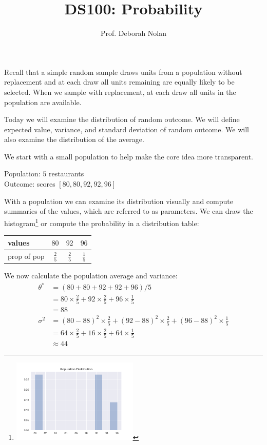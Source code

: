 \documentclass{tufte-handout}
\title{DS100: Probability}
\author{Prof. Deborah Nolan}
\date{\marginnote{Scribe: Simon Mo}}
\begin{document}
\maketitle

Recall that a simple random sample draws units from a population without replacement and at each draw all units remaining are equally likely to be selected. When we sample with replacement, at each draw all units in the population are available.

Today we will examine the distribution of random outcome. We will define expected value, variance, and standard deviation of random outcome. We will also examine the distribution of the average. 

We start with a small population to help make the core idea more transparent. 

\begin{center}
	Population: $5$ restaurants\\
	Outcome: scores $[80,80,92,92,96]$
\end{center}

With a population we can examine its distribution visually and compute summaries of the values, which are referred to as parameters. We can draw the histogram\footnote{\includegraphics[width=6cm]{dist}} or compute the probability in a distribution table:\begin{center}
	\begin{tabular}{l|ccc}
  values & $80$& $92$ & $96$\\
  \hline
  prop of pop & $\frac{2}{5}$ &$\frac{2}{5}$&$\frac{1}{5}$ \\
\end{tabular}
\end{center}

We now calculate the population average and variance: \begin{align*}
	\theta^* &= (80+80+92+92+96)/5 \\
					&= 80 \times \frac{2}{5} + 92 \times \frac{2}{5} + 96 \times \frac{1}{5} \\
					&= 88 \\
	\sigma^2 &= (80-88)^2 \times \frac{2}{5} +(92-88)^2 \times \frac{2}{5} +(96-88)^2 \times \frac{1}{5} \\
				&= 64 \times \frac{2}{5} +16\times \frac{2}{5} +64 \times \frac{1}{5} \\
				& \approx 44 \end{align*}
\end{document}
